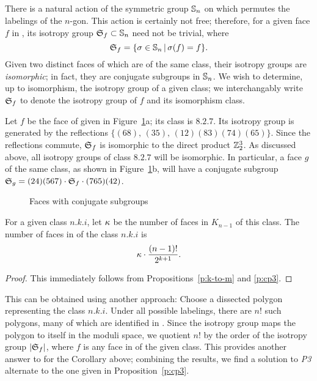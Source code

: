\documentclass[10pt]{amsart}
\begin{document}
        \subsection{}
        There is a natural action of the symmetric group $\mathbb S_n$ on  which permutes the labelings of the $n$-gon. This action is certainly not free; therefore, for a given face $f$ in , its isotropy group ${\mathfrak S}_f \subset \mathbb S_n$ need not be trivial, where  
        $${\mathfrak S}_f = \{\sigma \in \mathbb S_n \,|\, \sigma(f) = f\}.$$
        Given two distinct faces of  which are of the same class, their isotropy groups are {\em isomorphic}; in fact, they are conjugate subgroups in $\mathbb S_n$.  We wish to determine, up to isomorphism, the isotropy group of a given class; we interchangably write ${\mathfrak S}_f$ to denote the isotropy group of $f$ and its isomorphism class.
        
        \begin{exmp}
        Let $f$ be the face of  given in Figure~\ref{isotropy}a; its class is $8.2.7$.  Its isotropy group is generated by the reflections $\{(68),\, (35),\, (12)(83)(74)(65)\}$. Since the reflections commute,  ${\mathfrak S}_f$ is isomorphic to the direct product ${\mathbb Z}_2^3$. As discussed above, all isotropy groups of class $8.2.7$ will be isomorphic.  In particular, a face $g$ of the same class, as shown in Figure~\ref{isotropy}b, will have a conjugate subgroup  ${\mathfrak S}_g = (24)(567) \cdot {\mathfrak S}_f \cdot (765)(42)$.
        \label{e:isotropy}
        \end{exmp}
        
        \begin{figure}[h]
        \caption{Faces with conjugate subgroups}
        \label{isotropy}
        \end{figure}
        
        \begin{cor}
        For a given class $n.k.i$, let $\kappa$ be the number of faces in $K_{n-1}$ of this class.  The number of faces in  of the class $n.k.i$ is
        $$\kappa \cdot \frac{(n-1)!}{2^{k+1}}.$$
        \end{cor}
        
        \begin{proof}
        This immediately follows from Propositions~\ref{p:k-to-m} and \ref{p:cp3}.
        \end{proof}
        
        This can be obtained using another approach:  Choose a dissected polygon representing the class $n.k.i$.  Under all possible labelings, there are $n!$ such polygons, many of which are identified in .  Since the isotropy group maps the polygon to itself in the moduli space, we quotient $n!$ by the order of the isotropy group $|{\mathfrak S}_f|$, where $f$ is any face in  of the given class.  This provides another answer to for the Corollary above; combining the results, we find a solution to {\em P3}\, alternate to the one given in Proposition~\ref{p:cp3}.
        
\end{document}
